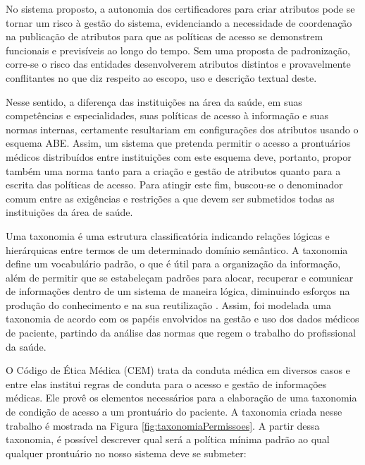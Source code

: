 \documentclass[a4paper,11pt]{article}
\begin{document}

No sistema proposto, a autonomia dos certificadores para criar atributos pode se tornar um risco à gestão do sistema, evidenciando a necessidade de coordenação na publicação de atributos para que as políticas de acesso se demonstrem funcionais e previsíveis ao longo do tempo. %
Sem uma proposta de padronização, corre-se o risco das entidades desenvolverem atributos distintos e provavelmente conflitantes no que diz respeito ao escopo, uso e descrição textual deste.

Nesse sentido, a diferença das instituições na área da saúde, em suas competências e especialidades,  suas políticas de acesso à informação e suas normas internas, certamente resultariam em configurações dos atributos usando o esquema ABE.
Assim, um sistema que pretenda permitir o acesso a prontuários médicos distribuídos entre instituições com este esquema deve, portanto, propor também uma norma tanto para a criação e gestão de atributos quanto para a escrita das políticas de acesso.
Para atingir este fim, buscou-se o denominador comum entre as exigências e restrições a que devem ser submetidos todas as instituições da área de saúde.

Uma taxonomia é uma estrutura classificatória indicando relações lógicas e hierárquicas entre termos de um determinado domínio semântico.
A taxonomia define um vocabulário padrão, o que é útil para a organização da informação, além de permitir que se estabeleçam padrões para alocar, recuperar e comunicar de informações dentro de um sistema de maneira lógica, diminuindo esforços na produção do conhecimento e na sua reutilização \cite{Campos2007}.
Assim, foi modelada uma taxonomia de acordo com os papéis envolvidos na gestão e uso dos dados médicos de paciente, partindo da análise das normas que regem o trabalho do profissional da saúde. %

O Código de Ética Médica (CEM) trata da conduta médica em diversos casos e entre elas institui regras de conduta para o acesso e gestão de informações médicas.
Ele provê os elementos necessários para a elaboração de uma taxonomia de condição de acesso a um prontuário do paciente.
A taxonomia criada nesse trabalho é mostrada na Figura \ref{fig:taxonomiaPermissoes}. %
A partir dessa taxonomia, é possível descrever qual será a política mínima padrão ao qual qualquer prontuário {\color{blue}no nosso sistema} deve se submeter:
\end{document}
